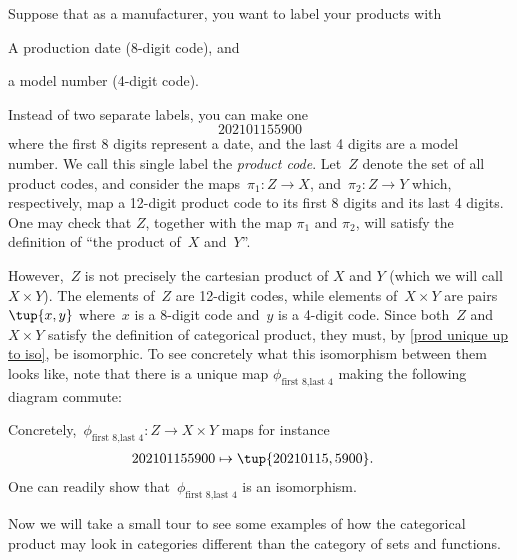 \begin{example}
  \label{ex univ prop prod}
  Suppose that as a manufacturer, you want to label your products with
  \begin{compactitem}
    \item A production date (8-digit code), and
    \item a model number (4-digit code).
  \end{compactitem}
  Instead of two separate labels, you can make one
  \begin{equation*}
    202101155900
  \end{equation*}
  where the first 8 digits represent a date, and the last 4 digits are a model number.
  We call this single label the \emph{product code}. Let~$Z$ denote the set of all product codes, and consider the maps~$\pi_1\colon Z\to X$, and~$\pi_2\colon Z\to Y$ which, respectively, map a 12-digit product code to its first 8 digits and its last 4 digits. One may check that $Z$, together with the map $\pi_1$ and $\pi_2$, will satisfy the definition of ``the product of~$X$ and~$Y$''.


  \begin{center}
  \end{center}

  However,~$Z$ is not precisely the cartesian product of $X$ and $Y$ (which we will call $X\times Y$). The elements of~$Z$ are 12-digit codes, while elements of~$X\times Y$ are pairs~$\tup{x,y}$ where~$x$ is a 8-digit code and~$y$ is a 4-digit code. Since both~$Z$ and~$X\times Y$ satisfy the definition of categorical product, they must, by \cref{prod unique up to iso}, be isomorphic.
  To see concretely what this isomorphism between them looks like, note that there is a unique map $\phi_{\text{first 8},\text{last 4}}$ making the following diagram commute:
  \begin{center}
  \end{center}
  Concretely,~$\phi_{\text{first 8},\text{last 4}}: Z \to X\times Y$ maps for instance
  \begin{equation*}
    \begin{aligned}
      202101155900&\mapsto \tup{20210115,5900}.
    \end{aligned}
  \end{equation*}
  One can readily show that~$\phi_{\text{first 8},\text{last 4}}$ is an isomorphism.
\end{example}

Now we will take a small tour to see some examples of how the categorical product may look in categories different than the category \Set of sets and functions.

